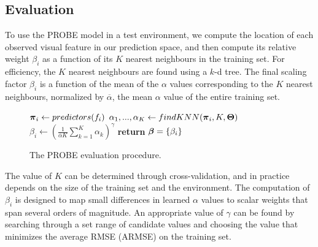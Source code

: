 \documentclass[letterpaper, 10 pt, conference]{ieeeconf}  %
\begin{document}
	\subsection{Evaluation}
To use the PROBE model in a test environment, we compute the location of each observed visual feature in our prediction space, and then compute its relative weight $\beta_i$ as a function of its $K$ nearest neighbours in the training set.
For efficiency, the $K$ nearest neighbours are found using a $k$-d tree.
The final scaling factor $\beta_i$ is a function of the mean of the $\alpha$ values corresponding to the $K$ nearest neighbours, normalized by $\overline \alpha$, the mean $\alpha$ value of the entire training set.

\begin{figure}[h]
\begin{algorithmic}[1]
	\State $\boldsymbol{\pi}_i  \gets predictors(f_i) $
	\State $\alpha_1,...,\alpha_K \gets findKNN(\boldsymbol{\pi}_i, K, \boldsymbol{\Theta})$
	\State $\beta_i \gets \left(\frac{1}{\overline{\alpha} K} \sum_{k=1}^K \alpha_k  \right)^{\gamma}$
\EndFor
\State \textbf{return}  $\boldsymbol{\beta} = \{\beta_i\}$
\EndProcedure
\end{algorithmic}
\caption{The PROBE evaluation procedure.}\label{fig:ProbeTest}
\vspace{-1em}
\end{figure}


The value of $K$ can be determined through cross-validation, and in practice depends on the size of the training set and the environment.
The computation of $\beta_i$ is designed to map small differences in learned $\alpha$ values to scalar weights that span several orders of magnitude.
An appropriate value of $\gamma$ can be found by searching through a set range of candidate values and choosing the value that minimizes the average RMSE (ARMSE) on the training set.
\end{document}
